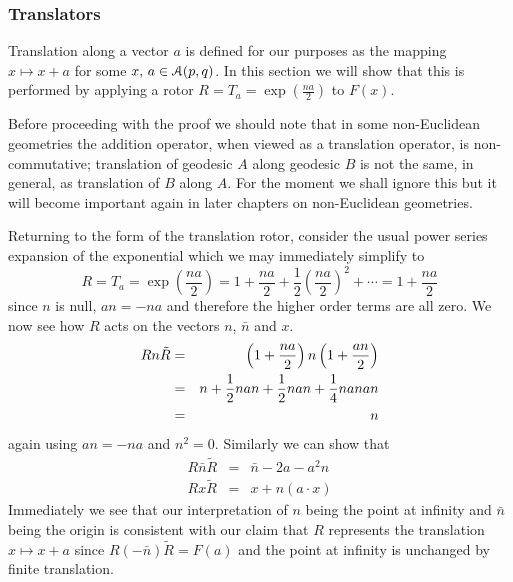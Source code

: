 \subsubsection{Translators}

Translation along a vector $a$ is defined for our purposes as the
mapping $x\mapsto x+a$ for some $x,\,a \in \mathcal{A}(p,q)$.
In this
section we will show that this is performed by applying a 
rotor $R=T_a = \exp\left({\frac{na}{2}}\right)$ to $F(x)$.

Before proceeding with the proof we should note that in some non-Euclidean
geometries the addition operator, when viewed as a translation operator, is
non-commutative; translation of geodesic $A$ along geodesic $B$ is not the
same, in general, as translation of $B$ along $A$. For the moment we shall
ignore this but it will become important again in later chapters on 
non-Euclidean geometries.

Returning to the form of the translation rotor, consider the usual power series 
expansion of the exponential which we may immediately simplify to
%
\begin{equation}
R=T_a = \exp\left({\frac{na}{2}}\right) = 1 + \frac{na}{2} +
\frac{1}{2}\left(\frac{na}{2}\right)^2 + \cdots   = 1 +
\frac{na}{2}
\end{equation}
%
since $n$ is null, $an = -na$ and therefore the higher order terms are all
zero. We now see how $R$ acts on the vectors $n$, $\bar{n}$ and $x$.
%
\begin{eqnarray}
 Rn\tilde{R} & = & \left(1 + \frac{na}{2}\right)n\left(1 + \frac{an}{2}\right) \nonumber \\
                & = &  n + \frac{1}{2}nan + \frac{1}{2}nan + \frac{1}{4}nanan \nonumber \\
                & = & n
                \label{rntrans}
\end{eqnarray}
%
again using  $an= - na$ and $n^2=0$.    Similarly we can
show that
%
\begin{eqnarray}
 R\bar{n}\tilde{R} & = &  \bar{n}  - 2a - a^2n \\
 Rx\tilde{R}          & = &  x + n(a\cdot x)
\end{eqnarray}
%
Immediately we see that our interpretation of $n$ being the point at
infinity and $\bar{n}$ being the origin is consistent with our claim that
$R$ represents the translation $x \mapsto x+a$ since 
$R(-\bar{n})\tilde{R} = F(a)$
and the point at infinity is unchanged by finite translation.


